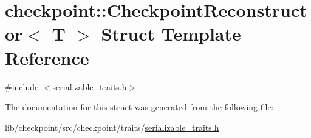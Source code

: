 \hypertarget{structcheckpoint_1_1_checkpoint_reconstructor}{}\section{checkpoint\+:\+:Checkpoint\+Reconstructor$<$ T $>$ Struct Template Reference}
\label{structcheckpoint_1_1_checkpoint_reconstructor}


{\ttfamily \#include $<$serializable\+\_\+traits.\+h$>$}



The documentation for this struct was generated from the following file\+:\begin{DoxyCompactItemize}
\item 
lib/checkpoint/src/checkpoint/traits/\hyperlink{serializable__traits_8h}{serializable\+\_\+traits.\+h}\end{DoxyCompactItemize}
